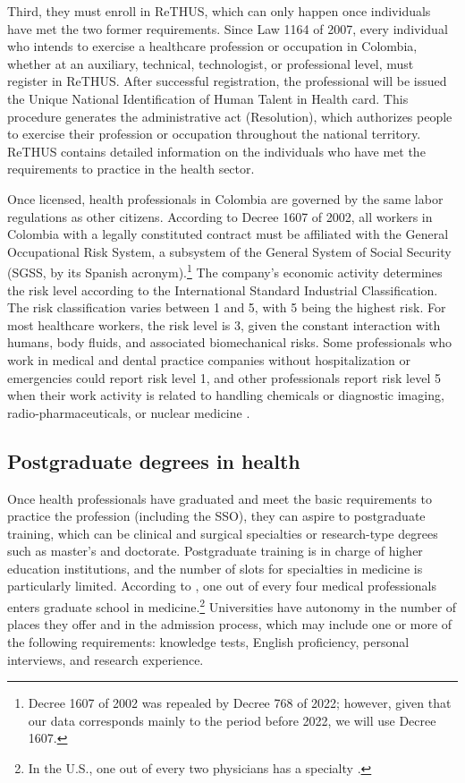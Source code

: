 \documentclass[12pt, a4paper]{article}
\begin{document}
Third, they must enroll in ReTHUS, which can only happen once individuals have met the two former requirements. Since Law 1164 of 2007, every individual who intends to exercise a healthcare profession or occupation in Colombia, whether at an auxiliary, technical, technologist, or professional level, must register in ReTHUS. After successful registration, the professional will be issued the Unique National Identification of Human Talent in Health card. This procedure generates the administrative act (Resolution), which authorizes people to exercise their profession or occupation throughout the national territory. ReTHUS contains detailed information on the individuals who have met the requirements to practice in the health sector. 

Once licensed, health professionals in Colombia are governed by the same labor regulations as other citizens. According to Decree 1607 of 2002, all workers in Colombia with a legally constituted contract must be affiliated with the General Occupational Risk System, a subsystem of the General System of Social Security (SGSS, by its Spanish acronym).\footnote{Decree 1607 of 2002 was repealed by Decree 768 of 2022; however, given that our data corresponds mainly to the period before 2022, we will use Decree 1607.} The company's economic activity determines the risk level according to the International Standard Industrial Classification. The risk classification varies between 1 and 5, with 5 being the highest risk. For most healthcare workers, the risk level is 3, given the constant interaction with humans, body fluids, and associated biomechanical risks. Some professionals who work in medical and dental practice companies without hospitalization or emergencies could report risk level 1, and other professionals report risk level 5 when their work activity is related to handling chemicals or diagnostic imaging, radio-pharmaceuticals, or nuclear medicine \citep{Ministeriodetrabajoyseguridadsocial}.


\subsection{Postgraduate degrees in health }

Once health professionals have graduated and meet the basic requirements to practice the profession (including the SSO), they can aspire to postgraduate training, which can be clinical and surgical specialties or research-type degrees such as master's and doctorate. Postgraduate training is in charge of higher education institutions, and the number of slots for specialties in medicine is particularly limited. According to \cite{trejos2022consideraciones}, one out of every four medical professionals enters graduate school in medicine.\footnote{In the U.S., one out of every two physicians has a specialty \citep{Statista}.} Universities have autonomy in the number of places they offer and in the admission process, which may include one or more of the following requirements: knowledge tests, English proficiency, personal interviews, and research experience.
\end{document}
